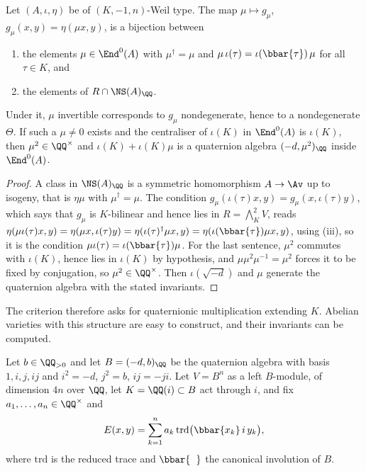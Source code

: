 \begin{lemma}\label{lem:Rendomorphism}
Let $(A,\iota,\eta)$ be of $(K,-1,n)$-Weil type. The map $\mu\mapsto
g_{\mu}$, $g_{\mu}(x,y)=\eta(\mu x,y)$, is a bijection between
\begin{enumerate}[label=\textup{(\alph*)},nosep]
\item the elements $\mu\in\End^{0}(A)$ with $\mu^{\dagger}=\mu$ and
  $\mu\,\iota(\tau)=\iota(\bbar{\tau})\,\mu$ for all $\tau\in K$, and
\item the elements of $R\cap\NS(A)_{\QQ}$.
\end{enumerate}
Under it, $\mu$ invertible corresponds to $g_{\mu}$ nondegenerate, hence to a
nondegenerate $\Theta$. If such a $\mu\ne0$ exists and the centraliser of
$\iota(K)$ in $\End^{0}(A)$ is $\iota(K)$, then $\mu^{2}\in\QQ^{\times}$ and
$\iota(K)+\iota(K)\mu$ is a quaternion algebra $(-d,\mu^{2})_{\QQ}$ inside
$\End^{0}(A)$.
\end{lemma}

\begin{proof}
A class in $\NS(A)_{\QQ}$ is a symmetric homomorphism $A\to\Av$ up to isogeny,
that is $\eta\mu$ with $\mu^{\dagger}=\mu$. The condition
$g_{\mu}(\iota(\tau)x,y)=g_{\mu}(x,\iota(\tau)y)$, which says that $g_{\mu}$ is
$K$-bilinear and hence lies in $R=\bigwedge^{2}_{K}V$, reads
$\eta(\mu\iota(\tau)x,y)=\eta(\mu x,\iota(\tau)y)=\eta(\iota(\tau)^{\dagger}\mu
x,y)=\eta(\iota(\bbar{\tau})\mu x,y)$, using (iii), so it
is the condition $\mu\iota(\tau)=\iota(\bbar{\tau})\mu$. For the last sentence,
$\mu^{2}$ commutes with $\iota(K)$, hence lies in $\iota(K)$ by hypothesis, and
$\mu\mu^{2}\mu^{-1}=\mu^{2}$ forces it to be fixed by conjugation, so
$\mu^{2}\in\QQ^{\times}$. Then $\iota(\sqrt{-d})$ and $\mu$ generate the
quaternion algebra with the stated invariants.
\end{proof}

The criterion therefore asks for quaternionic multiplication extending $K$.
Abelian varieties with this structure are easy to construct, and their
invariants can be computed.

\begin{setupenv}\label{setup:quat}
Let $b\in\QQ_{>0}$ and let $B=(-d,b)_{\QQ}$ be the quaternion algebra with
basis $1,i,j,ij$ and $i^{2}=-d$, $j^{2}=b$, $ij=-ji$. Let
$V=B^{n}$ as a left $B$-module, of dimension $4n$ over $\QQ$, let
$K=\QQ(i)\subset B$ act through $i$, and fix $a_{1},\dots,a_{n}\in\QQ^{\times}$
and
\begin{equation}\label{eq:quatE}
  E(x,y)=\sum_{k=1}^{n}a_{k}\,\mathrm{trd}\bigl(\bbar{x_{k}}\,i\,y_{k}\bigr),
\end{equation}
where $\mathrm{trd}$ is the reduced trace and $\bbar{\phantom{x}}$ the
canonical involution of $B$.
\end{setupenv}

